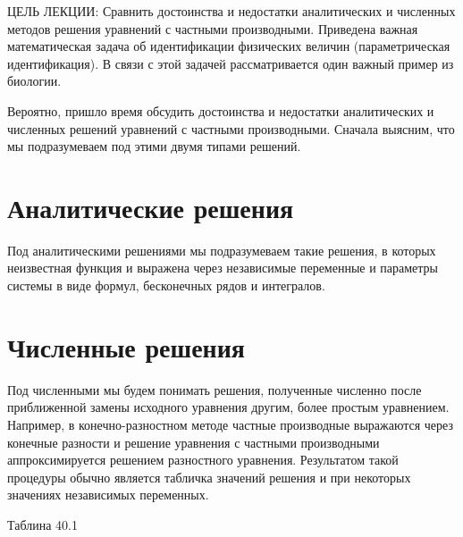 \documentclass[
]{article}
\begin{document}
{{{ЦЕЛЬ ЛЕКЦИИ: Сравнить достоинства и недостатки аналитических и численных
методов решения уравнений с частными производными. Приведена важная
математическая задача об идентификации физических величин
(параметрическая идентификация). В связи с этой задачей рассматривается
один важный пример из биологии.

Вероятно, пришло время обсудить достоинства и недостатки аналитических и
численных решений уравнений с частными производными. Сначала выясним,
что мы подразумеваем под этими двумя типами решений.

\section{Аналитические
решения}\label{ux430ux43dux430ux43bux438ux442ux438ux447ux435ux441ux43aux438ux435-ux440ux435ux448ux435ux43dux438ux44f}

Под аналитическими решениями мы подразумеваем такие решения, в которых
неизвестная функция и выражена через независимые переменные и параметры
системы в виде формул, бесконечных рядов и интегралов.

\section{Численные
решения}\label{ux447ux438ux441ux43bux435ux43dux43dux44bux435-ux440ux435ux448ux435ux43dux438ux44f}

Под численными мы будем понимать решения, полученные численно после
приближенной замены исходного уравнения другим, более простым
уравнением. Например, в конечно-разностном методе частные производные
выражаются через конечные разности и решение уравнения с частными
производными аппроксимируется решением разностного уравнения.
Результатом такой процедуры обычно является табличка значений решения и
при некоторых значениях независимых переменных.

Таблина 40.1

}}}
\end{document}
